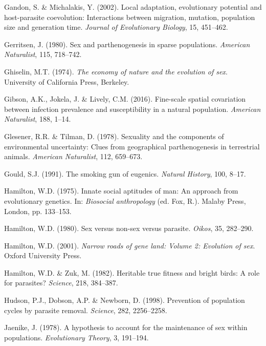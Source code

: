 \documentclass[
  letterpaper,
]{book}
\newlength{\cslhangindent}
\newenvironment{CSLReferences}[2] %
 {\begin{list}{}{%
  \setlength{\itemindent}{0pt}
  \setlength{\leftmargin}{0pt}
  \setlength{\parsep}{0pt}
  \ifodd #1
   \setlength{\leftmargin}{\cslhangindent}
   \setlength{\itemindent}{-1\cslhangindent}
  \fi
  \setlength{\itemsep}{#2\baselineskip}}}
 {\end{list}}
\begin{document}
\begin{CSLReferences}{1}{0}
Gandon, S. \& Michalakis, Y. (2002). Local adaptation, evolutionary
potential and host-parasite coevolution: Interactions between migration,
mutation, population size and generation time. \emph{Journal of
Evolutionary Biology}, 15, 451--462.

Gerritsen, J. (1980). Sex and parthenogenesis in sparse populations.
\emph{American Naturalist}, 115, 718--742.

Ghiselin, M.T. (1974). \emph{The economy of nature and the evolution of
sex}. University of California Press, Berkeley.

Gibson, A.K., Jokela, J. \& Lively, C.M. (2016). Fine-scale spatial
covariation between infection prevalence and susceptibility in a natural
population. \emph{American Naturalist}, 188, 1--14.

Glesener, R.R. \& Tilman, D. (1978). Sexuality and the components of
environmental uncertainty: Clues from geographical parthenogenesis in
terrestrial animals. \emph{American Naturalist}, 112, 659--673.

Gould, S.J. (1991). The smoking gun of eugenics. \emph{Natural History},
100, 8--17.

Hamilton, W.D. (1975). Innate social aptitudes of man: An approach from
evolutionary genetics. In: \emph{Biosocial anthropology} (ed. Fox, R.).
Malaby Press, London, pp. 133--153.

Hamilton, W.D. (1980). Sex versus non-sex versus parasite. \emph{Oikos},
35, 282--290.

Hamilton, W.D. (2001). \emph{Narrow roads of gene land: Volume 2:
Evolution of sex}. Oxford University Press.

Hamilton, W.D. \& Zuk, M. (1982). Heritable true fitness and bright
birds: A role for parasites? \emph{Science}, 218, 384--387.

Hudson, P.J., Dobson, A.P. \& Newborn, D. (1998). Prevention of
population cycles by parasite removal. \emph{Science}, 282, 2256--2258.

Jaenike, J. (1978). A hypothesis to account for the maintenance of sex
within populations. \emph{Evolutionary Theory}, 3, 191--194.


\end{CSLReferences}
\end{document}

